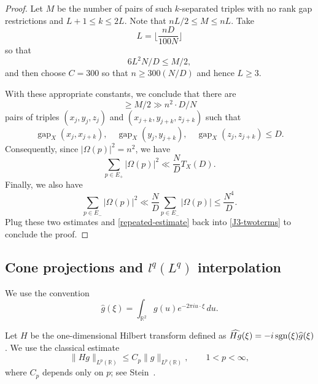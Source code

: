 \documentclass{amsart}
\numberwithin{equation}{section}
\newcommand{\wh}{\widehat}
\newcommand{\R}{\mathbb{R}}
\begin{document}
\begin{proof}
    Let \(M\) be the number of pairs of such \(k\)-separated triples with no rank gap restrictions and $L+1\leq k\leq 2L$. 
    Note that \(nL/2\leq  M \leq nL\).
    Take
    \[
    L  =\Big\lfloor\frac{nD}{100N}\Big\rfloor 
    \]
    so that
    \[
    6L ^2 N /D \leq M/2,
    \]
    and then choose \(C =300\) so that $n\geq 300(N/D)$ and hence \(L \geq 3\).
    
    \smallskip 
    
    With these appropriate constants, we conclude that there are
    \[
    \geq M/2 \gg n ^2 \cdot D/N  
    \]
    pairs of triples \((x_j,y_j,z_j)\) and \((x_{j+k},y_{j+k},z_{j+k})\) such that
    \[
    \operatorname{gap}_X(x_j, x_{j+k}),\quad
    \operatorname{gap}_X(y_j, y_{j+k}), \quad
    \operatorname{gap}_X(z_j,z_{j+k}) \leq D.
    \]
    Consequently, since $|\Omega(p)|^2=n^2$, we have
    \begin{equation}
    \nonumber
        \sum_{p\in E_+}|\Omega(p)|^2\ll \frac{N}{D}T_X(D).
    \end{equation}
    Finally, we also have
    \begin{equation}
    \nonumber
        \sum_{p\in E_-}|\Omega(p)|^2\ll\frac{N}{D}\sum_{p\in E_-}|\Omega(p)| \leq \frac{N^4}{D}.
    \end{equation}
    Plug these two estimates and \eqref{repeated-estimate} back into \eqref{J3-twoterms} to conclude the proof.
    \qedhere
    
\end{proof}

\bigskip

\subsection{Cone projections and $l^q(L^q)$ interpolation}
We use the convention
\begin{equation}
    \nonumber
    \widehat g(\xi)=\int_{\R^2}g(u)e^{-2\pi i u\cdot\xi}\,du.
\end{equation}

\medskip 

Let $H$ be the one-dimensional Hilbert transform defined as $\wh {Hg}(\xi)=-i\, {\rm sgn}(\xi)\wh g(\xi)$.
We use the classical estimate
\begin{equation}
    \label{Hilbert}
    \|Hg\|_{L^p(\R)}\leq C_p\|g\|_{L^p(\R)},\qquad 1<p<\infty,
\end{equation}
where $C_p$ depends only on $p$; see Stein~\cite{Stein}.
\end{document}
